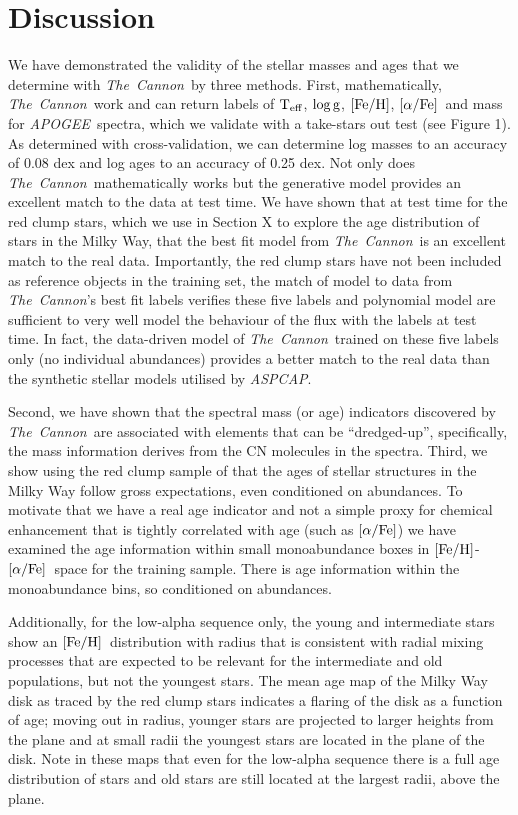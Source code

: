 \documentclass[12pt, preprint]{aastex}
\newcommand{\project}[1]{\textsl{#1}}
\newcommand{\tc}{\project{The~Cannon}}
\newcommand{\apogee}{\project{APOGEE}}
\newcommand{\aspcap}{\project{ASPCAP}}
\newcommand{\teff}{\mbox{$\rm T_{eff}$}}
\newcommand{\feh}{\mbox{$\rm [Fe/H]$}}
\newcommand{\alphafe}{\mbox{$\rm [\alpha/Fe]$}}
\newcommand{\logg}{\mbox{$\rm \log g$}}
\begin{document}
\section{Discussion}

We have demonstrated the validity of the stellar masses and ages that we determine with \tc\ by three methods. First, mathematically, \tc\ work and can return labels of \teff, \logg, \feh, \alphafe\ and mass for \apogee\ spectra, which we validate with a take-stars out test (see Figure 1). As determined with cross-validation, we can determine log masses to an accuracy of 0.08 dex and log ages to an accuracy of 0.25 dex. Not only does \tc\ mathematically works but the generative model provides an excellent match to the data at test time. We have shown that at test time for the red clump stars, which we use in Section X to explore the age distribution of stars in the Milky Way, that the best fit model from \tc\ is an excellent match to the real data. Importantly, the red clump stars have not been included as reference objects in the training set, the match of model to data from \tc's best fit labels verifies these five labels and polynomial model are sufficient to very well model the behaviour of the flux with the labels at test time.  In fact, the data-driven model of \tc\ trained on these five labels only (no individual abundances) provides a better match to the real data than the synthetic stellar models utilised by \aspcap.

Second, we have shown that the spectral mass (or age) indicators discovered by \tc\ are associated with elements that can be ``dredged-up'', specifically, the mass information derives from the CN molecules in the spectra. Third, we show using the red clump sample of \citet{Bovy2014} that the ages of stellar structures in the Milky Way follow gross expectations, even conditioned on abundances. To motivate that we have a real age indicator and not a simple proxy for chemical enhancement that is tightly correlated with age (such as \alphafe) we have examined the age information within small monoabundance boxes in \feh-\alphafe\ space for the training sample. There is age information within the monoabundance bins, so conditioned on abundances. 

Additionally, for the low-alpha sequence only, the young and intermediate stars show an \feh\ distribution with radius that is consistent with radial mixing processes that are expected to be relevant for the intermediate and old populations, but not the youngest stars.  The mean age map of the Milky Way disk as traced by the red clump stars indicates a flaring of the disk as a function of age; moving out in radius, younger stars are projected to larger heights from the plane and at small radii the youngest stars are located in the plane of the disk. Note in these maps that even for the low-alpha sequence there is a full age distribution of stars and old stars are still located at the largest radii, above the plane. 
\end{document}
